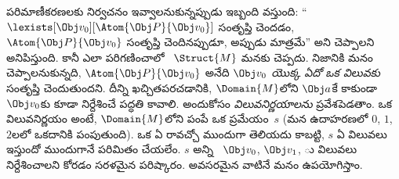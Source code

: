 \documentclass[../../../include/open-logic-section]{subfiles}
\begin{document}
పరిమాణీకరణలకు నిర్వచనం ఇవ్వాలనుకున్నప్పుడు ఇబ్బంది వస్తుంది:
``$\lexists[\Obj v_0][\Atom{\Obj P}{\Obj v_0}]$ సంతృప్తి చెందడం,
$\Atom{\Obj P}{\Obj v_0}$ సంతృప్తి చెందినప్పుడూ, అప్పుడు మాత్రమే''
అని చెప్పాలని అనిపిస్తుంది. కానీ  ఎలా పరిగణించాలో
~$\Struct{M}$ మనకు చెప్పదు. నిజానికి మనం చెప్పాలనుకున్నది,
$\Atom{\Obj P}{\Obj v_0}$ అనేది \emph{$\Obj v_0$ యొక్క ఏదో ఒక
విలువకు} సంతృప్తి చెందుతుందని. దీన్ని ఖచ్చితపరచడానికి,
$\Domain{M}$లోని  $\Obj a$కే కాకుండా $\Obj v_0$కు
కూడా నిర్దేశించే పద్ధతి కావాలి. అందుకోసం \emph{ విలువనిర్ణయాలను} ప్రవేశపెడతాం. ఒక  విలువనిర్ణయం అంటే,
 $\Domain{M}$లోని  పంపే ఒక ప్రమేయం~$s$
(మన ఉదాహరణలో $0$, $1$, $2$లలో ఒకదానికి పంపుతుంది). ఒక
 ఏ  రావచ్చో ముందుగా తెలియదు కాబట్టి, $s$
ఏ  విలువలు ఇస్తుందో ముందుగానే పరిమితం చేయలేం. $s$ అన్ని
~$\Obj v_0$, $\Obj v_1$, ు విలువలు నిర్దేశించాలని
కోరడం సరళమైన పరిష్కారం. అవసరమైన వాటినే మనం ఉపయోగిస్తాం.
\end{document}
